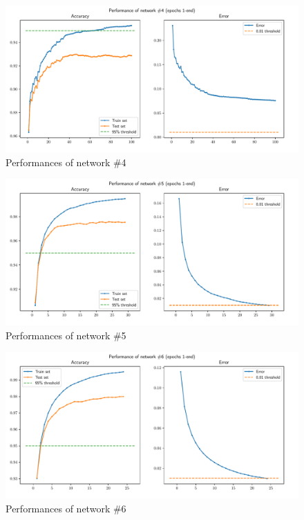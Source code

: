 \documentclass[letterpaper,headings=standardclasses]{scrartcl}
\begin{document}
\begin{figure}[H]
    \centering
    \includegraphics[width=\linewidth]{net4.pdf}
    \caption{Performances of network \#4}
    \label{net4}
\end{figure}

\begin{figure}[H]
    \centering
    \includegraphics[width=\linewidth]{net5.pdf}
    \caption{Performances of network \#5}
    \label{net5}
\end{figure}

\begin{figure}[H]
    \centering
    \includegraphics[width=\linewidth]{net6.pdf}
    \caption{Performances of network \#6}
    \label{net6}
\end{figure}
\end{document}
